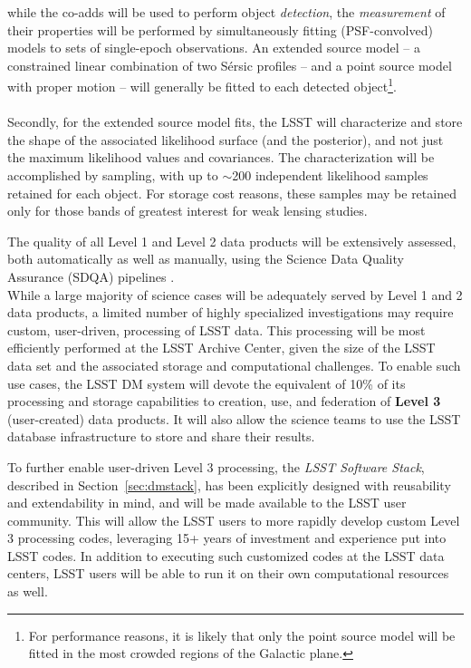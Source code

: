 \documentclass[11pt,twoside]{article}
\begin{document}
\begin{itemize}
while the co-adds will be used to perform object {\em detection}, the
{\em measurement} of their properties will be performed by
simultaneously fitting (PSF-convolved) models to sets of single-epoch
observations. An extended source model -- a constrained linear
combination of two S\'ersic profiles -- and a point source model with
proper motion -- will generally be
fitted to each detected object\footnote{For performance reasons, it is
  likely that only the point source model will be fitted in the most
  crowded regions of the Galactic plane.}.\\
\\
Secondly, for the extended source model fits, the LSST will
characterize and store the shape of the associated likelihood surface
(and the posterior), and not just the maximum likelihood values and
covariances. The characterization will be accomplished by sampling,
with up to $\sim$200 independent likelihood samples retained for
each object. For storage cost reasons, these samples
may be retained only for those bands of greatest interest for
weak lensing studies.

\end{itemize}

The quality of all Level 1 and Level 2 data products will be extensively
assessed, both automatically as well as manually, using the Science
Data Quality Assurance (SDQA) pipelines \citep{LSE-63}.
\\

While a large majority of science cases will be adequately served by
Level 1 and 2 data products, a limited number of highly specialized
investigations may require custom, user-driven, processing of LSST
data. This processing will be most efficiently performed at the
LSST Archive Center, given the size of the LSST data set and the
associated storage and computational challenges. To enable such use
cases, the LSST DM system will devote the equivalent of 10\% of its
processing and storage capabilities to creation, use, and federation
of {\bf Level 3} (user-created) data products. It will also allow the
science teams to use the LSST database infrastructure to store and
share their results.

To further enable user-driven Level 3 processing, the {\em LSST Software
Stack}, described in Section~\ref{sec:dmstack}, has been explicitly
designed with reusability and extendability in mind, and will be made
available to the LSST user community. This will allow the LSST users to
more rapidly develop custom Level 3 processing codes, leveraging 15+
years of investment and experience put into LSST codes. In addition to
executing such customized codes at the LSST data centers, LSST users
will be able to run it on their own computational resources as well.\\
\end{document}
